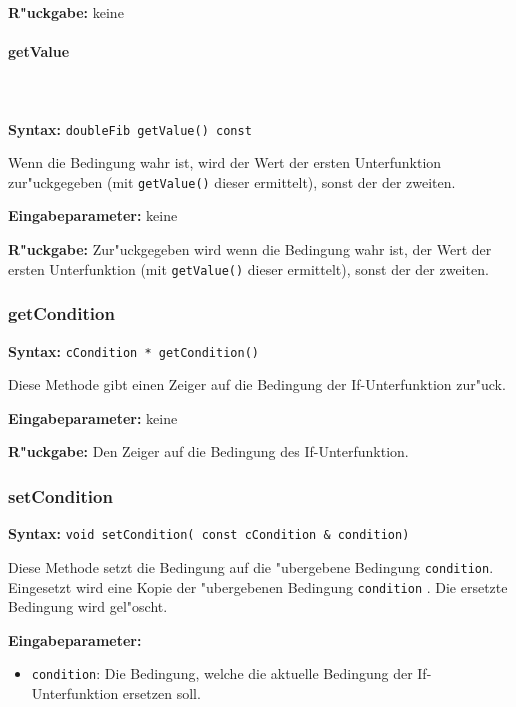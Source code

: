 \bigskip\noindent
\textbf{R"uckgabe:} keine


\paragraph{getValue}

\ \\\\\noindent
\textbf{Syntax:} \verb|doubleFib getValue() const|

\bigskip\noindent
Wenn die Bedingung wahr ist, wird der Wert der ersten Unterfunktion zur"uckgegeben (mit \verb|getValue()| dieser ermittelt), sonst der der zweiten.

\bigskip\noindent
\textbf{Eingabeparameter:} keine

\bigskip\noindent
\textbf{R"uckgabe:} Zur"uckgegeben wird wenn die Bedingung wahr ist, der Wert der ersten Unterfunktion (mit \verb|getValue()| dieser ermittelt), sonst der der zweiten.


\subsubsection{getCondition}

\textbf{Syntax:} \verb|cCondition * getCondition()|

\bigskip\noindent
Diese Methode gibt einen Zeiger auf die Bedingung der If-Unterfunktion zur"uck.

\bigskip\noindent
\textbf{Eingabeparameter:} keine

\bigskip\noindent
\textbf{R"uckgabe:} Den Zeiger auf die Bedingung des If-Unterfunktion.


\subsubsection{setCondition}

\textbf{Syntax:} \verb|void setCondition( const cCondition & condition)|

\bigskip\noindent
Diese Methode setzt die Bedingung auf die "ubergebene Bedingung \verb|condition|. Eingesetzt wird eine Kopie der "ubergebenen Bedingung \verb|condition| . Die ersetzte Bedingung wird gel"oscht.

\bigskip\noindent
\textbf{Eingabeparameter:}
\begin{itemize}
 \item \verb|condition|: Die Bedingung, welche die aktuelle Bedingung der If-Unterfunktion ersetzen soll.
\end{itemize}

